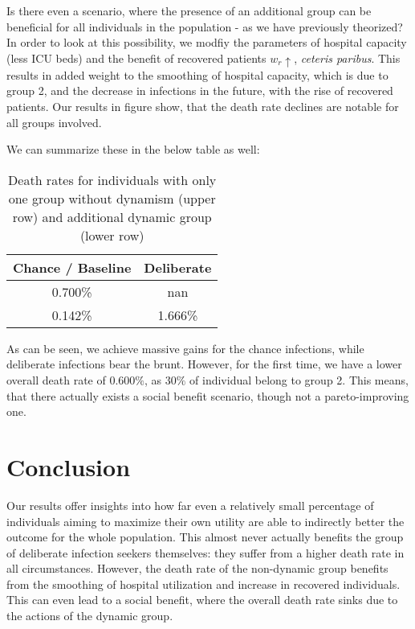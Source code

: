 \documentclass[]{article}
\begin{document}
Is there even a scenario, where the presence of an additional group can be beneficial for all individuals in the population - as we have previously theorized? In order to look at this possibility, we modfiy the parameters of hospital capacity (less ICU beds) and the benefit of recovered patients $w_r \uparrow$, \textit{ceteris paribus}. This results in added weight to the smoothing of hospital capacity, which is due to group 2, and the decrease in infections in the future, with the rise of recovered patients. Our results in figure  show, that the death rate declines are notable for all groups involved. 

We can summarize these in the below table  as well: 
\begin{table}[h!]
\centering
 \begin{tabular}{||c c||} 

 \hline
 Chance / Baseline & Deliberate  \\ [0.5ex] 
 \hline\hline
 0.700\% & nan  \\ 
 0.142\% & 1.666\%  \\ [1ex] 
 \hline
 \end{tabular}
 \caption{Death rates for individuals with only one group without dynamism (upper row) and additional dynamic group (lower row)}
 \label{tab:rates}
\end{table}

As can be seen, we achieve massive gains for the chance infections, while deliberate infections bear the brunt. However, for the first time, we have a lower overall death rate of $0.600\%$, as $30\%$ of individual belong to group 2. This means, that there actually exists a social benefit scenario, though not a pareto-improving one. 


\section{Conclusion}

Our results offer insights into how far even a relatively small percentage of individuals aiming to maximize their own utility are able to indirectly better the outcome for the whole population. This almost never actually benefits the group of deliberate infection seekers themselves: they suffer from a higher death rate in all circumstances. However, the death rate of the non-dynamic group benefits from the smoothing of hospital utilization and increase in recovered individuals. This can even lead to a social benefit, where the overall death rate sinks due to the actions of the dynamic group. 
\end{document}
